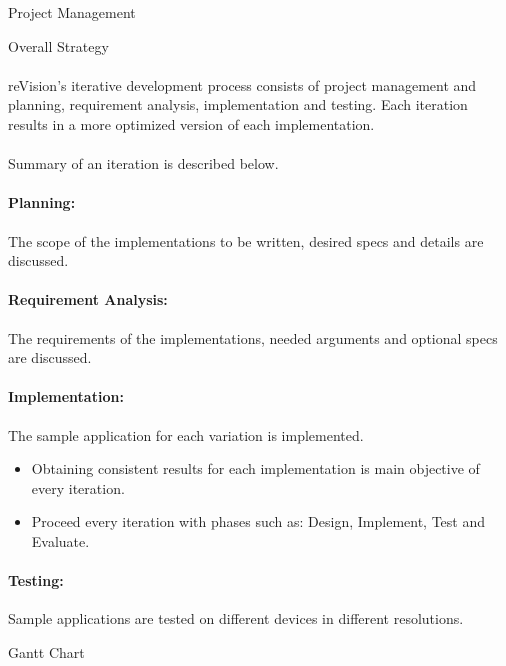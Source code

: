 \documentclass[12pt, a4paper]{article} \pagenumbering{gobble}
\begin{document}
\begin{section}{Project Management}
  \begin{subsection}{Overall Strategy}
    \paragraph{}{reVision's iterative development process consists of project management and planning, requirement analysis,
    implementation and testing. Each iteration results in a more optimized version of each implementation.}\\ \\
    Summary of an iteration is described below.
    \paragraph{Planning:}{The scope of the implementations to be written, desired specs and details are discussed.}
    \paragraph{Requirement Analysis:}{The requirements of the implementations, needed arguments and optional specs are discussed.}
    \paragraph{Implementation:}{The sample application for each variation is implemented.
      \begin{itemize}
        \item Obtaining consistent results for each implementation is main objective of every iteration.
        \item Proceed every iteration with phases such as: Design, Implement, Test and Evaluate.
      \end{itemize}
    }
    \paragraph{Testing:}{Sample applications are tested on different devices in different resolutions.}
  \end{subsection}

  \newpage

  \begin{subsection}{Gantt Chart}

  \begin{centering}
\end{centering}
\end{subsection}
\end{section}
\end{document}

